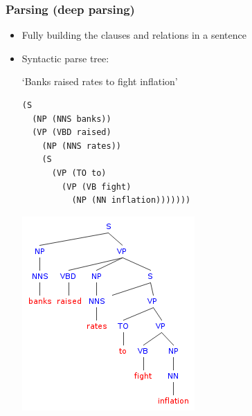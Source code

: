 \begin{frame}[fragile]
\frametitle{Parsing (deep parsing)}

\begin{itemize}
\item Fully building the clauses and relations in a sentence
\item Syntactic parse tree:
\begin{multicols}{2}
`Banks raised rates to fight inflation'

{\small
\begin{verbatim}
(S
  (NP (NNS banks))
  (VP (VBD raised)
    (NP (NNS rates))
    (S
      (VP (TO to)
        (VP (VB fight)
          (NP (NN inflation)))))))
\end{verbatim}
}

\includegraphics[width=\linewidth]{syntax-tree}

\end{multicols}
\end{itemize}
\end{frame}


